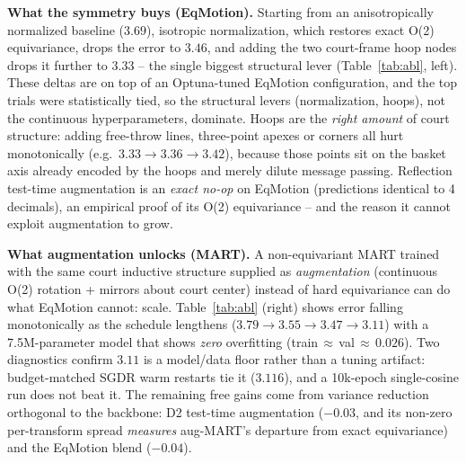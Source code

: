 \documentclass{article} %
\begin{document}
\textbf{What the symmetry buys (EqMotion).} Starting from an anisotropically
normalized baseline ($3.69$), isotropic normalization, which restores exact O(2)
equivariance, drops the error to $3.46$, and adding the two court-frame hoop
nodes drops it further to $3.33$ -- the single biggest structural lever
(Table~\ref{tab:abl}, left). These deltas are on top of an Optuna-tuned EqMotion
configuration, and the top trials were statistically tied, so the structural
levers (normalization, hoops), not the continuous hyperparameters, dominate. Hoops are the \emph{right amount} of court
structure: adding free-throw lines, three-point apexes or corners all hurt
monotonically (e.g.\ $3.33\rightarrow3.36\rightarrow3.42$), because those points
sit on the basket axis already encoded by the hoops and merely dilute message
passing. Reflection test-time augmentation is an \emph{exact no-op} on EqMotion
(predictions identical to 4 decimals), an empirical proof of its O(2)
equivariance -- and the reason it cannot exploit augmentation to grow.

\textbf{What augmentation unlocks (MART).} A non-equivariant MART trained with the
same court inductive structure supplied as \emph{augmentation} (continuous O(2)
rotation + mirrors about court center) instead of hard equivariance can do what
EqMotion cannot: scale. Table~\ref{tab:abl} (right) shows error falling
monotonically as the schedule lengthens ($3.79\rightarrow3.55\rightarrow
3.47\rightarrow3.11$) with a 7.5M-parameter model that shows \emph{zero}
overfitting (train$\,\approx\,$val$\,\approx\,0.026$). Two diagnostics confirm
$3.11$ is a model/data floor rather than a tuning artifact: budget-matched SGDR
warm restarts tie it ($3.116$), and a 10k-epoch single-cosine run does not beat
it. The remaining free gains come from variance reduction orthogonal to the
backbone: D2 test-time augmentation ($-0.03$, and its non-zero per-transform
spread \emph{measures} aug-MART's departure from exact equivariance) and the
EqMotion blend ($-0.04$).
\end{document}
